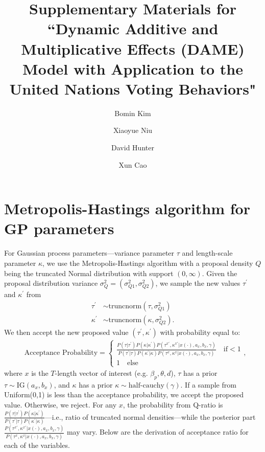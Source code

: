 \documentclass[a4paper]{article}
\title{Supplementary Materials for \\``Dynamic Additive and Multiplicative Effects (DAME) Model with Application to the United Nations Voting Behaviors"}
\author[1]{Bomin Kim}
\author[1]{Xiaoyue Niu}
\author[1]{David Hunter}
\author[2]{Xun Cao}
\affil[1]{Department of Statistics, The Pennsylvania State University}
\affil[2]{Department of Political Science, The Pennsylvania State University}
\date{}
\begin{document}
	\maketitle
\section{Metropolis-Hastings algorithm for GP parameters}
For Gaussian process parameters---variance parameter $\tau$ and length-scale parameter $\kappa$, we use the Metropolis-Hastings algorithm with a proposal density $Q$ being the truncated Normal distribution with support $(0, \infty)$. Given the proposal distribution variance $\sigma^2_Q = (\sigma^2_{Q1}, \sigma^2_{Q2})$, we sample the new values $\tau^\prime$ and $\kappa^\prime$ from
\begin{equation}
\begin{aligned}
\tau^\prime &\sim \mbox{truncnorm}(\tau, \sigma^2_{Q1})\\
\kappa^\prime &\sim \mbox{truncnorm}(\kappa,\sigma^2_{Q2}).
\end{aligned}
\end{equation}
We then accept the new proposed value $(\tau^\prime, \kappa^\prime)$ with probability equal to:
\begin{equation}
\begin{split}
& \mbox{Acceptance Probability}=
\begin{cases}  \frac{P(\tau|\tau^\prime)P(\kappa|\kappa^\prime)P(\tau^{x\prime}, \kappa^{x\prime}|x(\cdot), a_x, b_x,\gamma)}{P(\tau^\prime|\tau)P(\kappa^\prime|\kappa)P(\tau^{x}, \kappa^{x}|x(\cdot), a_x, b_x,\gamma)}\quad\text{if}  <1\\
1 \quad \text{else}
\end{cases},
\end{split}
\end{equation}
where $x$ is the $T$-length vector of interest (e.g. $\beta_p, \theta, d$), $\tau$ has a prior $\tau \sim \mbox{IG}(a_x, b_x)$, and $\kappa$ has a prior $\kappa \sim \mbox{half-cauchy}(\gamma)$. If a sample from Uniform(0,1) is less than the acceptance probability, we accept the proposed value. Otherwise, we reject.
For any $x$, the probability from Q-ratio is $\frac{P(\tau|\tau^\prime)P(\kappa|\kappa^\prime)}{P(\tau^\prime|\tau)P(\kappa^\prime|\kappa)}$---i.e., ratio of truncated normal densities---while the posterior part $\frac{P(\tau^{x\prime}, \kappa^{x\prime}|x(\cdot), a_x, b_x,\gamma)}{P(\tau^{x}, \kappa^{x}|x(\cdot), a_x, b_x,\gamma)}$ may vary. Below are the derivation of acceptance ratio for each of the variables.
\end{document}
